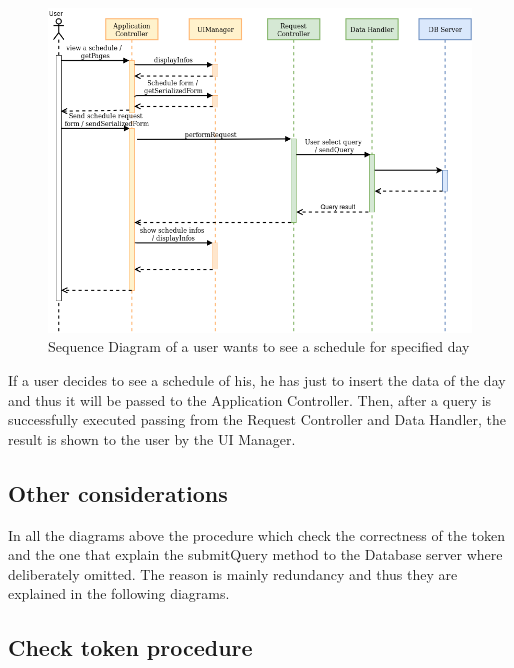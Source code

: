 \documentclass[numbers=noenddot, 12pt, a4paper, oneside]{scrbook}
\begin{document}
\begin{figure}[H]
	\centering
	\includegraphics[width=1.1\textwidth,angle=-0]{images/Goal9}
	\caption{Sequence Diagram of a user wants to see a schedule for specified day}
\end{figure}

If a user decides to see a schedule of his, he has just to insert the data of the day and thus it will be passed to the Application Controller. Then, after a query is successfully executed passing from the Request Controller and Data Handler, the result is shown to the user by the UI Manager.

\subsection*{Other considerations}

In all the diagrams above the procedure which check the correctness of the token and the one that explain the submitQuery method to the Database server where deliberately omitted. The reason is mainly redundancy and thus they are explained in the following diagrams.\\

\subsection*{Check token procedure}
\end{document}
